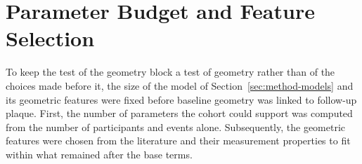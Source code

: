 \providecommand{\clarify}[1]{\textcolor{red}{\textbf{Clarification needed:} #1}}
\section{Parameter Budget and Feature Selection}
\label{sec:method-size}

To keep the test of the geometry block a test of geometry rather than of the choices made before it, the size of the model of Section~\ref{sec:method-models} and its geometric features were fixed before baseline geometry was linked to follow-up plaque.
First, the number of parameters the cohort could support was computed from the number of participants and events alone.
Subsequently, the geometric features were chosen from the literature and their measurement properties to fit within what remained after the base terms.

